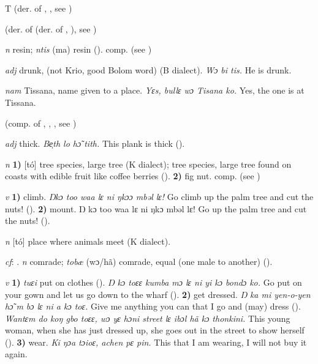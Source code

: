 \begin{letter}{T}
 (der. of , , see )

 (der. of  (der. of , ), see ) 

 \textit{n} resin; \textit{ntis} (ma) resin (\citealt{Pichl1967}). comp.  (see ) 

 \textit{adj} drunk, (not Krio, good Bolom word) (B dialect). \textit{Wɔ bi tis.} He is drunk. 

 \textit{nam} Tissana, name given to a place. \textit{Yɛs, bullɛ wɔ Tisana ko.} Yes, the one is at Tissana.

 (comp. of , , , see ) 

 \textit{adj} thick. \textit{Be̹th lo hɔ̃ tith.} This plank is thick (\citealt{Pichl1967}). 

 \textit{n} \textbf{1)} [tó] tree species, large tree (K dialect); tree species, large tree found on coasts with edible fruit like coffee berries (\citealt{Pichl1967}). \textbf{2)} fig nut. comp.  (see ) 

 \textit{v} \textbf{1)} climb. \textit{Ŋkɔ too waa lɛ ni ŋkɔɔ mbəl lɛ!} Go climb up the palm tree and cut the nuts! (\citealt{Pichl1967}). \textbf{2)} mount. Ŋ kɔ too waa lɛ ni ŋkɔ mbəl lɛ! Go up the palm tree and cut the nuts! (\citealt{Pichl1967}). 

 \textit{n} [tó] place where animals meet (K dialect). 

 \textit{cf}: . \textit{n} comrade; \textit{tobæ} (wɔ/hã) comrade, equal (one male to another) (\citealt{Pichl1967}). 

 \textit{v} \textbf{1)} \textit{tuɛi} put on clothes (\citealt{Sumner1921}). \textit{Ŋ kɔ toɛɛ kumba mɔ lɛ ni yi kɔ bondɔ ko.} Go put on your gown and let us go down to the wharf (\citealt{Pichl1967}). \textbf{2)} get dressed. \textit{Ŋ ka mi yen-o-yen hɔ̃ m bɔ lɛ ni a kɔ toɛ.} Give me anything you can that I go and (may) dress (\citealt{Pichl1967}). \textit{Wantɛm do koŋ gbo toɛɛ, wɔ yɛ hɔni street lɛ ibɔl hã kɔ thonkini.} This young woman, when she has just dressed up, she goes out in the street to show herself (\citealt{Pichl1967}). \textbf{3)} wear. \textit{Ki ŋɔa tɔioɛ, achen pɛ pin.} This that I am wearing, I will not buy it again.


\end{letter}
